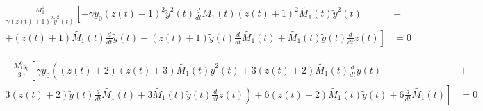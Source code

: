 \documentclass[12pt, letterpaper]{article}
\begin{document}
\begin{equation}
\begin{aligned}
\frac{M^{0}_{1}}{\gamma (z(t) + 1)^{2} \tilde{y}^{2}(t)}
\left[ - \gamma y_{0} (z(t) + 1)^{2} \tilde{y}^{2}(t) \frac{d}{d t} \tilde{M_1}(t) \right. (z(t) + 1)^{2} \tilde{M_1}(t) \tilde{y}^{2}(t) & - \\
 + (z(t) + 1) \tilde{M_1}(t) \frac{d}{d t} \tilde{y}(t) -
\left. (z(t) + 1) \tilde{y}(t) \frac{d}{d t} \tilde{M_1}(t) + \tilde{M_1}(t) \tilde{y}(t) \frac{d}{d t} z(t) \right] & = 0
\end{aligned}
\end{equation}


\begin{equation}
\begin{aligned}
- \frac{M^{0}_{1} y_{0}}{3 \gamma}
\left[\gamma y_{0} \left(\left(z{\left(t \right)} + 2\right) \left(z{\left(t \right)} + 3\right) \tilde{M_1}{\left(t \right)} \tilde{y}^{2}{\left(t \right)} + 3 \left(z{\left(t \right)} + 2\right) \tilde{M_1}{\left(t \right)} \frac{d}{d t} \tilde{y}{\left(t \right)} \right. \right. & + \\
\left. \left. 3 \left(z{\left(t \right)} + 2\right) \tilde{y}{\left(t \right)} \frac{d}{d t} \tilde{M_1}{\left(t \right)} + 3 \tilde{M_1}{\left(t \right)} \tilde{y}{\left(t \right)} \frac{d}{d t} z{\left(t \right)}\right) + 6 \left(z{\left(t \right)} + 2\right) \tilde{M_1}{\left(t \right)} \tilde{y}{\left(t \right)} + 6 \frac{d}{d t} \tilde{M_1}{\left(t \right)}\right] & = 0
\end{aligned}
\end{equation}
\end{document}
